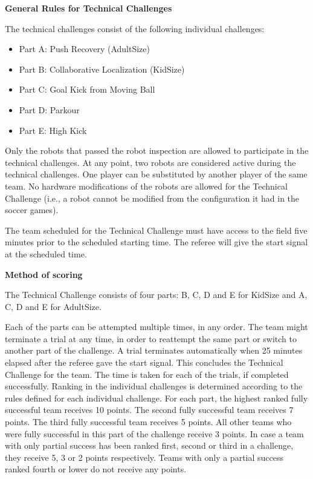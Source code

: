 \clearpage
\sffamily
{\bfseries\color[rgb]{0.4,0.4,0.4}
General Rules for Technical Challenges}
{}

\bigskip

The technical challenges consist of the following individual challenges:

\begin{itemize}
\item Part A: Push Recovery (AdultSize)
\item Part B: Collaborative Localization (KidSize)
\item Part C: Goal Kick from Moving Ball
\item Part D: Parkour
\item Part E: High Kick
\end{itemize}

\bigskip

Only the robots that passed the robot inspection are allowed to participate in the technical challenges.
At any point, two robots are considered active during the technical challenges.
One player can be substituted by another player of the same team.
No hardware modifications of the robots are allowed for the Technical Challenge
(i.e., a robot cannot be modified from the configuration it had in the soccer games). 

\bigskip

The team scheduled for the Technical Challenge must have access to the field five minutes prior to the scheduled starting time. The referee will give the start signal at the scheduled time.

\bigskip

{\bfseries Method of scoring}

\headlinebox
 
The Technical Challenge consists of four parts:
  B, C, D and E for KidSize and
  A, C, D and E for AdultSize.

Each of the parts can be attempted multiple times, in any order.
The team might terminate a trial at any time,
in order to reattempt the same part or switch to another part of the challenge.
A trial terminates automatically when 25 minutes elapsed after the referee gave
the start signal.
This concludes the Technical Challenge for the team.
The time is taken for each of the trials, if completed successfully.
Ranking in the individual challenges is determined according to the rules
defined for each individual challenge.
For each part, the highest ranked fully successful team receives 10 points.
The second fully successful team receives 7 points.
The third fully successful team receives 5 points.
All other teams who were fully successful in this part of the challenge receive 3 points.
In case a team with only partial success has been ranked first, second or third in a challenge, they receive 5, 3 or 2 points respectively. 
Teams with only a partial success ranked fourth or lower do not receive any points.

